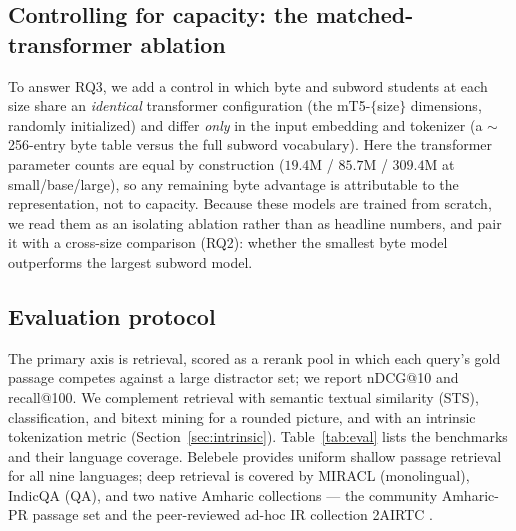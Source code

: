 \documentclass[11pt]{article}
\begin{document}
\subsection{Controlling for capacity: the matched-transformer ablation}
\label{sec:matched}
To answer RQ3, we add a control in which byte and subword students at each size share an
\emph{identical} transformer configuration (the mT5-$\{$size$\}$ dimensions, randomly initialized) and
differ \emph{only} in the input embedding and tokenizer (a $\sim$256-entry byte table versus the full
subword vocabulary). Here the transformer parameter counts are equal by construction
($19.4$M / $85.7$M / $309.4$M at small/base/large), so any remaining byte advantage is attributable to
the representation, not to capacity. Because these models are trained from scratch, we read them as an
isolating ablation rather than as headline numbers, and pair it with a cross-size comparison (RQ2):
whether the smallest byte model outperforms the largest subword model.

\subsection{Evaluation protocol}
The primary axis is retrieval, scored as a rerank pool in which each query's gold passage competes
against a large distractor set; we report nDCG@10 and recall@100. We complement retrieval with
semantic textual similarity (STS), classification, and bitext mining for a rounded picture, and with
an intrinsic tokenization metric (Section~\ref{sec:intrinsic}). Table~\ref{tab:eval} lists the
benchmarks and their language coverage. Belebele provides uniform shallow passage retrieval for all
nine languages; deep retrieval is covered by MIRACL (monolingual), IndicQA (QA), and two native
Amharic collections --- the community Amharic-PR passage set and the peer-reviewed ad-hoc IR
collection 2AIRTC \citep{yeshambel2020twoairtc}.
\end{document}
